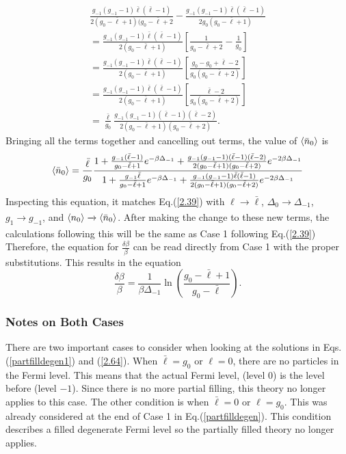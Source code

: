 \begin{gather}
    \frac{g_{-1}(g_{-1}-1)\bar{\ell}(\bar{\ell}-1)}{2(g_0-\bar{\ell}+1)(g_0-\bar{\ell}+2}-\frac{g_{-1}(g_{-1}-1)\bar{\ell}(\bar{\ell}-1)}{2g_0(g_0-\bar{\ell}+1)}\nonumber\\
    =\frac{g_{-1}(g_{-1}-1)\bar{\ell}(\bar{\ell}-1)}{2(g_0-\bar{\ell}+1)}[\frac{1}{g_0-\bar{\ell}+2}-\frac{1}{g_0}]\nonumber\\
    =\frac{g_{-1}(g_{-1}-1)\bar{\ell}(\bar{\ell}-1)}{2(g_0-\bar{\ell}+1)}[\frac{g_0-g_0+\bar{\ell}-2}{g_0(g_0-\bar{\ell}+2)}]\nonumber\\
    =\frac{g_{-1}(g_{-1}-1)\bar{\ell}(\bar{\ell}-1)}{2(g_0-\bar{\ell}+1)}[\frac{\bar{\ell}-2}{g_0(g_0-\bar{\ell}+2)}]\nonumber\\
    =\frac{\bar{\ell}}{g_0}\frac{g_{-1}(g_{-1}-1)(\bar{\ell}-1)(\bar{\ell}-2)}{2(g_0-\bar{\ell}+1)(g_0-\bar{\ell}+2)}.
\end{gather}
Bringing all the terms together and cancelling out terms, the value of $\left<{\bar{n}_0}\right>$ is 
\begin{equation}
    \left<{\bar{n}_0}\right>=\frac{\bar{\ell}}{g_0}\frac{1+\frac{g_{-1}(\bar{\ell}-1)}{g_0-\bar{\ell}+1}e^{-\beta\Delta_{-1}}+\frac{g_{-1}(g_{-1}-1)(\bar{\ell}-1)(\bar{\ell}-2)}{2(g_0-\bar{\ell}+1)(g_0-\bar{\ell}+2)}e^{-2\beta\Delta_{-1}}}{1+\frac{g_{-1}\bar{\ell}}{g_0-\bar{\ell}+1}e^{-\beta\Delta_{-1}}+\frac{g_{-1}(g_{-1}-1)\bar{\ell}(\bar{\ell}-1)}{2(g_0-\bar{\ell}+1)(g_0-\bar{\ell}+2)}e^{-2\beta\Delta_{-1}}}
\end{equation}
Inspecting this equation, it matches Eq.\@ (\ref{2.39}) with $\ell\xrightarrow[]{}\bar{\ell}$, $\Delta_0\xrightarrow[]{}\Delta_{-1}$, $g_1\xrightarrow[]{}g_{-1}$, and $\left<{n_0}\right>\xrightarrow[]{}\left<{\bar{n}_0}\right>$. After making the change to these new terms, the calculations following this will be the same as Case 1 following Eq.\@ (\ref{2.39}) Therefore, the equation for $\frac{\delta\beta}{\beta}$ can be read directly from Case 1 with the proper substitutions. This results in the equation 
\begin{equation}
    \frac{\delta\beta}{\beta}=\frac{1}{\beta\Delta_{-1}}\ln(\frac{g_0-\bar{\ell}+1}{g_0-\bar{\ell}}). \label{2.64}
\end{equation}
\subsubsection{Notes on Both Cases}
There are two important cases to consider when looking at the solutions in Eqs.\@ (\ref{partfilldegen1}) and (\ref{2.64}). When $\bar{\ell}=g_0$ or $\ell=0$, there are no particles in the Fermi level. This means that the actual Fermi level, (level $0$) is the level before (level $-1$). Since there is no more partial filling, this theory no longer applies to this case. The other condition is when $\bar{\ell}=0$ or $\ell=g_0$. This was already considered at the end of Case 1 in Eq.\@ (\ref{partfilldegen}). This condition describes a filled degenerate Fermi level so the partially filled theory no longer applies. 